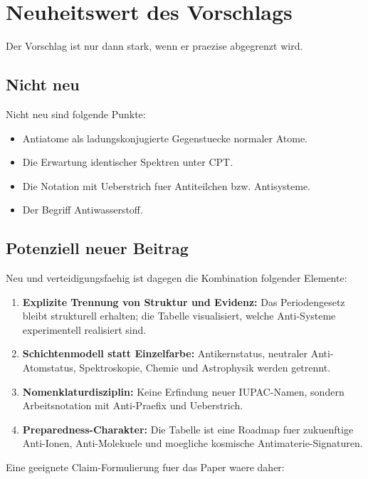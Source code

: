 \documentclass[11pt,a4paper]{article}
\begin{document}


\section{Neuheitswert des Vorschlags}

Der Vorschlag ist nur dann stark, wenn er praezise abgegrenzt wird.

\subsection{Nicht neu}

Nicht neu sind folgende Punkte:

\begin{itemize}
  \item Antiatome als ladungskonjugierte Gegenstuecke normaler Atome.
  \item Die Erwartung identischer Spektren unter CPT.
  \item Die Notation mit Ueberstrich fuer Antiteilchen bzw. Antisysteme.
  \item Der Begriff Antiwasserstoff.
\end{itemize}

\subsection{Potenziell neuer Beitrag}

Neu und verteidigungsfaehig ist dagegen die Kombination folgender Elemente:

\begin{enumerate}
  \item \textbf{Explizite Trennung von Struktur und Evidenz:} Das Periodengesetz bleibt strukturell erhalten; die Tabelle visualisiert, welche Anti-Systeme experimentell realisiert sind.
  \item \textbf{Schichtenmodell statt Einzelfarbe:} Antikernstatus, neutraler Anti-Atomstatus, Spektroskopie, Chemie und Astrophysik werden getrennt.
  \item \textbf{Nomenklaturdisziplin:} Keine Erfindung neuer IUPAC-Namen, sondern Arbeitsnotation mit Anti-Praefix und Ueberstrich.
  \item \textbf{Preparedness-Charakter:} Die Tabelle ist eine Roadmap fuer zukuenftige Anti-Ionen, Anti-Molekuele und moegliche kosmische Antimaterie-Signaturen.
\end{enumerate}

Eine geeignete Claim-Formulierung fuer das Paper waere daher:
\end{document}
